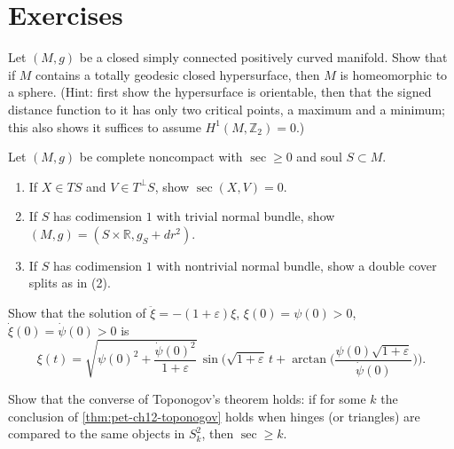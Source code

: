 \section{Exercises}

\begin{remark}
  \label{rem:pet-ch12-ex-12-8-1}
  Let $(M,g)$ be a closed simply connected positively curved manifold. Show
  that if $M$ contains a totally geodesic closed hypersurface, then $M$ is
  homeomorphic to a sphere. (Hint: first show the hypersurface is orientable,
  then that the signed distance function to it has only two critical points, a
  maximum and a minimum; this also shows it suffices to assume
  $H^1(M,\mathbb{Z}_2)=0$.)
\end{remark}

\begin{remark}
  \label{rem:pet-ch12-ex-12-8-2}
  Let $(M,g)$ be complete noncompact with $\sec\ge0$ and soul $S\subset M$.
  \begin{enumerate}
    \item If $X\in TS$ and $V\in T^\perp S$, show $\sec(X,V)=0$.
    \item If $S$ has codimension $1$ with trivial normal bundle, show
      $(M,g)=(S\times\mathbb{R},g_S+dr^2)$.
    \item If $S$ has codimension $1$ with nontrivial normal bundle, show a
      double cover splits as in (2).
  \end{enumerate}
\end{remark}

\begin{remark}
  \label{rem:pet-ch12-ex-12-8-3}
  Show that the solution of $\ddot\xi=-(1+\varepsilon)\xi$,
  $\xi(0)=\psi(0)>0$, $\dot\xi(0)=\dot\psi(0)>0$ is
  \[
    \xi(t)=\sqrt{\psi(0)^2+\frac{\dot\psi(0)^2}{1+\varepsilon}}\,
    \sin\Big(\sqrt{1+\varepsilon}\,t+\arctan\Big(\frac{\psi(0)\sqrt{1+\varepsilon}}{\dot\psi(0)}\Big)\Big).
  \]
\end{remark}

\begin{remark}
  \label{rem:pet-ch12-ex-12-8-4}
  Show that the converse of Toponogov's theorem holds: if for some $k$ the
  conclusion of \cref{thm:pet-ch12-toponogov} holds when hinges (or triangles)
  are compared to the same objects in $S_k^2$, then $\sec\ge k$.
\end{remark}


